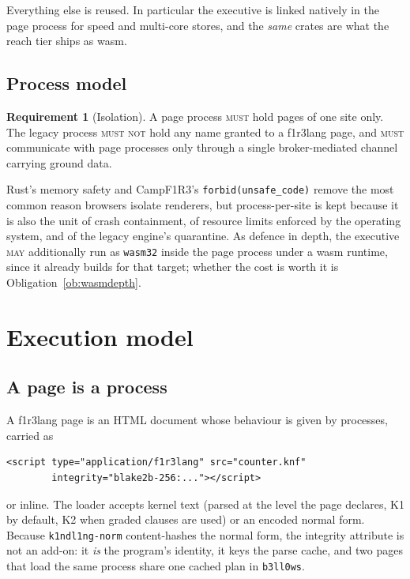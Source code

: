 \documentclass[11pt]{article}
\theoremstyle{definition}
\newtheorem{requirement}{Requirement}
\theoremstyle{remark}
\newcommand{\fl}{f1r3lang}
\newcommand{\Camp}{CampF1R3}
\newcommand{\MUST}{\textsc{must}}
\newcommand{\MUSTNOT}{\textsc{must not}}
\newcommand{\MAY}{\textsc{may}}
\newcommand{\code}[1]{\texttt{#1}}
\begin{document}
\noindent
Everything else is reused. In particular the executive is linked natively in the page
process for speed and multi-core stores, and the \emph{same} crates are what the reach
tier ships as wasm.

\subsection{Process model}

\begin{requirement}[Isolation]
A page process \MUST{} hold pages of one site only. The legacy process \MUSTNOT{}
hold any name granted to a \fl{} page, and \MUST{} communicate with page processes
only through a single broker-mediated channel carrying ground data.
\end{requirement}

\noindent
Rust's memory safety and \Camp{}'s \code{forbid(unsafe\_code)} remove the most common
reason browsers isolate renderers, but process-per-site is kept because it is also
the unit of crash containment, of resource limits enforced by the operating system,
and of the legacy engine's quarantine. As defence in depth, the executive
\MAY{} additionally run as \code{wasm32} inside the page process under a wasm
runtime, since it already builds for that target; whether the cost is worth it is
Obligation~\ref{ob:wasmdepth}.

\section{Execution model}\label{sec:exec}

\subsection{A page is a process}\label{sec:loading}

A \fl{} page is an HTML document whose behaviour is given by processes, carried as
\begin{lstlisting}
<script type="application/f1r3lang" src="counter.knf"
        integrity="blake2b-256:..."></script>
\end{lstlisting}
or inline. The loader accepts kernel text (parsed at the level the page declares,
K1 by default, K2 when graded clauses are used) or an encoded normal form. Because
\code{k1ndl1ng-norm} content-hashes the normal form, the integrity attribute is not an
add-on: it \emph{is} the program's identity, it keys the parse cache, and two pages
that load the same process share one cached plan in \code{b3ll0ws}.
\end{document}
